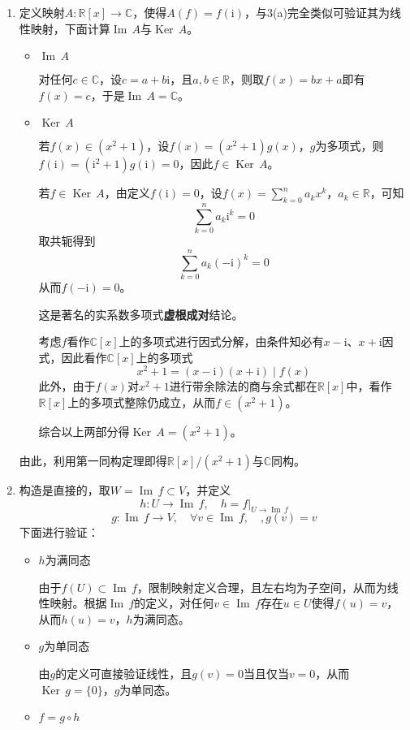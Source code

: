 \documentclass[a4paper,UTF8,fontset=windows,AutoFakeBold]{ctexart}
\DeclareMathOperator{\im}{Im\,}
\DeclareMathOperator{\Ker}{Ker\,}
\newcommand*{\ir}{\mathrm{i}}
\newcommand*{\note}{\noindent *}
\begin{document}
\begin{enumerate}
    \item
    定义映射$A:\mathbb{R}[x]\to\mathbb{C}$，使得$A(f)=f(\ir)$，与3(a)完全类似可验证其为线性映射，下面计算$\im A$与$\Ker A$。

    \begin{itemize}
        \item $\im A$
        
        对任何$c\in\mathbb{C}$，设$c=a+b\ir$，且$a,b\in\mathbb{R}$，则取$f(x)=bx+a$即有$f(x)=c$，于是$\im A=\mathbb{C}$。

        \item $\Ker A$
        
        若$f(x)\in(x^2+1)$，设$f(x)=(x^2+1)g(x)$，$g$为多项式，则$f(\ir)=(\ir^2+1)g(\ir)=0$，因此$f\in\Ker A$。

        若$f\in\Ker A$，由定义$f(\ir)=0$，设$f(x)=\sum_{k=0}^na_kx^k$，$a_k\in\mathbb{R}$，可知
        $$\sum_{k=0}^na_k\ir^k=0$$
        取共轭得到
        $$\sum_{k=0}^na_k(-\ir)^k=0$$
        从而$f(-\ir)=0$。

        \note 这是著名的实系数多项式\textbf{虚根成对}结论。

        考虑$f$看作$\mathbb{C}[x]$上的多项式进行因式分解，由条件知必有$x-\ir$、$x+\ir$因式，因此看作$\mathbb{C}[x]$上的多项式
        $$x^2+1=(x-\ir)(x+\ir)\mid f(x)$$
        此外，由于$f(x)$对$x^2+1$进行带余除法的商与余式都在$\mathbb{R}[x]$中，看作$\mathbb{R}[x]$上的多项式整除仍成立，从而$f\in(x^2+1)$。

        综合以上两部分得$\Ker A=(x^2+1)$。
    \end{itemize}
    由此，利用第一同构定理即得$\mathbb{R}[x]/(x^2+1)$与$\mathbb{C}$同构。

    \item
    构造是直接的，取$W=\im f\subset V$，并定义
    $$h:U\to\im f,\quad h=f|_{U\to\im f}$$
    $$g:\im f\to V,\quad\forall v\in\im f,\quad,g(v)=v$$
    下面进行验证：
    \begin{itemize}
        \item $h$为满同态
        
        由于$f(U)\subset\im f$，限制映射定义合理，且左右均为子空间，从而为线性映射。根据$\im f$的定义，对任何$v\in\im f$存在$u\in U$使得$f(u)=v$，从而$h(u)=v$，$h$为满同态。
        
        \item $g$为单同态
        
        由$g$的定义可直接验证线性，且$g(v)=0$当且仅当$v=0$，从而$\Ker g=\{0\}$，$g$为单同态。

        \item $f=g\circ h$
        

\end{itemize}
\end{enumerate}
\end{document}
